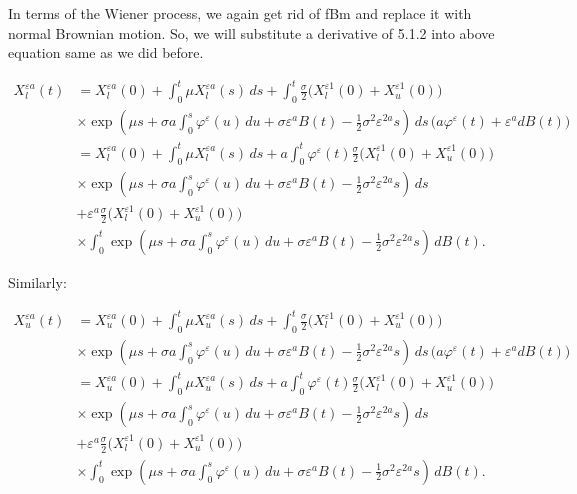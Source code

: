 \documentclass[12pt,a4paper]{report}
\numberwithin{equation}{section}
\begin{document}
In terms of the Wiener process, we again get rid of fBm and replace it
with normal Brownian motion. So, we will substitute a derivative of
5.1.2 into above equation same as we did before.

\[
\begin{aligned}
X_{l}^{\varepsilon a}(t)
&= X_{l}^{\varepsilon a}(0)
+ \int_{0}^{t}\mu X_{l}^{\varepsilon a}(s)\,ds
+ \int_{0}^{t}\frac{\sigma}{2}\bigl(X_{l}^{\varepsilon 1}(0)+X_{u}^{\varepsilon 1}(0)\bigr) \\
&\times \exp\!\left(\mu s+\sigma a\int_{0}^{s}\varphi^{\varepsilon}(u)\,du+\sigma\varepsilon^{a}B(t)-\frac{1}{2}\sigma^{2}\varepsilon^{2a}s\right)\,ds\,
\bigl(a\varphi^{\varepsilon}(t)+\varepsilon^{a}dB(t)\bigr) \\
&= X_{l}^{\varepsilon a}(0)
+ \int_{0}^{t}\mu X_{l}^{\varepsilon a}(s)\,ds
+ a\int_{0}^{t}\varphi^{\varepsilon}(t)\frac{\sigma}{2}\bigl(X_{l}^{\varepsilon 1}(0)+X_{u}^{\varepsilon 1}(0)\bigr) \\
&\times \exp\!\left(\mu s+\sigma a\int_{0}^{s}\varphi^{\varepsilon}(u)\,du+\sigma\varepsilon^{a}B(t)-\frac{1}{2}\sigma^{2}\varepsilon^{2a}s\right)\,ds \\
&+ \varepsilon^{a}\frac{\sigma}{2}\bigl(X_{l}^{\varepsilon 1}(0)+X_{u}^{\varepsilon 1}(0)\bigr) \\
&\times \int_{0}^{t}\exp\!\left(\mu s+\sigma a\int_{0}^{s}\varphi^{\varepsilon}(u)\,du+\sigma\varepsilon^{a}B(t)-\frac{1}{2}\sigma^{2}\varepsilon^{2a}s\right)\,dB(t).
\end{aligned}
\]




Similarly:

\[
\begin{aligned}
X_{u}^{\varepsilon a}(t)
&= X_{u}^{\varepsilon a}(0)
+ \int_{0}^{t}\mu X_{u}^{\varepsilon a}(s)\,ds
+ \int_{0}^{t}\frac{\sigma}{2}\bigl(X_{l}^{\varepsilon 1}(0)+X_{u}^{\varepsilon 1}(0)\bigr) \\
&\times \exp\!\left(\mu s+\sigma a\int_{0}^{s}\varphi^{\varepsilon}(u)\,du+\sigma\varepsilon^{a}B(t)-\frac{1}{2}\sigma^{2}\varepsilon^{2a}s\right)\,ds\,
\bigl(a\varphi^{\varepsilon}(t)+\varepsilon^{a}dB(t)\bigr) \\
&= X_{u}^{\varepsilon a}(0)
+ \int_{0}^{t}\mu X_{u}^{\varepsilon a}(s)\,ds
+ a\int_{0}^{t}\varphi^{\varepsilon}(t)\frac{\sigma}{2}\bigl(X_{l}^{\varepsilon 1}(0)+X_{u}^{\varepsilon 1}(0)\bigr) \\
&\times \exp\!\left(\mu s+\sigma a\int_{0}^{s}\varphi^{\varepsilon}(u)\,du+\sigma\varepsilon^{a}B(t)-\frac{1}{2}\sigma^{2}\varepsilon^{2a}s\right)\,ds \\
&+ \varepsilon^{a}\frac{\sigma}{2}\bigl(X_{l}^{\varepsilon 1}(0)+X_{u}^{\varepsilon 1}(0)\bigr) \\
&\times \int_{0}^{t}\exp\!\left(\mu s+\sigma a\int_{0}^{s}\varphi^{\varepsilon}(u)\,du+\sigma\varepsilon^{a}B(t)-\frac{1}{2}\sigma^{2}\varepsilon^{2a}s\right)\,dB(t).
\end{aligned}
\]
\end{document}
